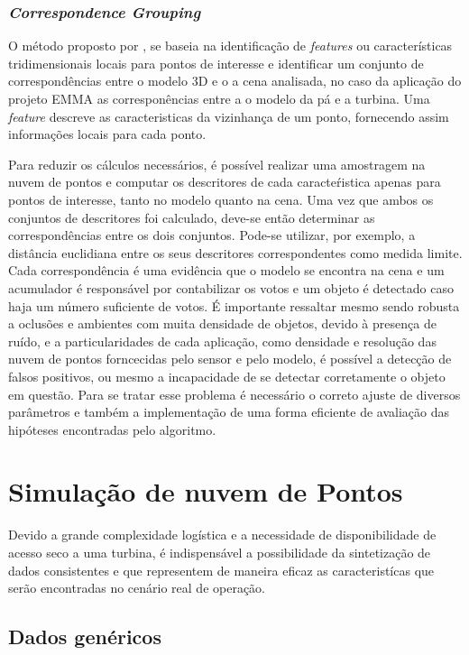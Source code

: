 \subsubsection{\textit{Correspondence Grouping}}
 
O método proposto por \cite{Tombari2010a}, se baseia na identificação de
\textit{features} ou características tridimensionais locais para pontos de
interesse e identificar um conjunto de correspondências entre o modelo 3D e o a
cena analisada, no caso da aplicação do projeto EMMA as corresponências entre a
o modelo da pá e a turbina. Uma \textit{feature} descreve as caracteristicas da
vizinhança de um ponto, fornecendo assim informações locais para cada ponto. 

Para reduzir os cálculos necessários, é possível realizar uma amostragem na
nuvem de pontos e computar os descritores de cada caracteŕistica apenas para
pontos de interesse, tanto no modelo quanto na cena. Uma vez que ambos os
conjuntos de descritores foi calculado, deve-se então determinar as
correspondências entre os dois conjuntos. Pode-se utilizar, por exemplo, a
distância euclidiana entre os seus descritores correspondentes como medida
limite. Cada correspondência é uma evidência que o modelo se encontra na cena e
um acumulador é responsável por contabilizar os votos e um objeto é detectado
caso haja um número suficiente de votos. É importante ressaltar mesmo sendo
robusta a oclusões e ambientes com muita densidade de objetos, devido à presença de
ruído, e a particularidades de cada aplicação, como densidade e resolução das
nuvem de pontos forncecidas pelo sensor e pelo modelo, é possível a detecção de
falsos positivos, ou mesmo a incapacidade de se detectar corretamente o objeto
em questão. Para se tratar esse problema é necessário o correto ajuste de
diversos parâmetros e também a implementação de uma forma eficiente de avaliação
das hipóteses encontradas pelo algoritmo. 


\section{Simulação de nuvem de Pontos}

Devido a grande complexidade logística e a necessidade de disponibilidade de
acesso seco a uma turbina, é indispensável a possibilidade da sintetização de
dados consistentes e que representem de maneira eficaz as caracteristícas que
serão encontradas no cenário real de operação. 

\subsection{Dados genéricos}

